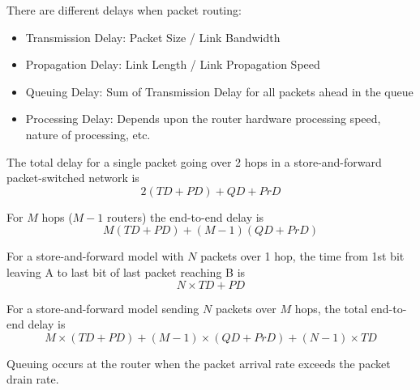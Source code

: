 There are different delays when packet routing:
\begin{itemize}
    \item Transmission Delay: Packet Size / Link Bandwidth
    \item Propagation Delay: Link Length / Link Propagation Speed
    \item Queuing Delay: Sum of Transmission Delay for all packets
          ahead in the queue
    \item Processing Delay: Depends upon the router hardware
          processing speed, nature of processing, etc.
\end{itemize}

The total delay for a single packet going over 2 hops in a
store-and-forward packet-switched network is
\begin{equation}
    2(TD + PD) + QD + PrD
\end{equation}

For $M$ hops ($M-1$ routers) the end-to-end delay is
\begin{equation}
    M (TD + PD) + (M - 1) (QD + PrD)
\end{equation}

For a store-and-forward model with $N$ packets over 1 hop,
the time from 1st bit leaving A to last bit of last packet
reaching B is
\begin{equation}
    N\times TD + PD
\end{equation}

For a store-and-forward model sending $N$ packets over $M$
hops, the total end-to-end delay is
\begin{equation}
    M \times (TD + PD) + (M-1) \times (QD + PrD) + (N-1) \times TD
\end{equation}

Queuing occurs at the router when the packet arrival rate
exceeds the packet drain rate.

